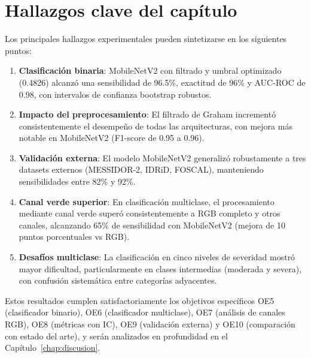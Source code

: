 \section*{Hallazgos clave del capítulo}

Los principales hallazgos experimentales pueden sintetizarse en los siguientes puntos:

\begin{enumerate}
    \item \textbf{Clasificación binaria}: MobileNetV2 con filtrado y umbral optimizado 
(0.4826) alcanzó una sensibilidad de 96.5\%, exactitud de 96\% y AUC-ROC de 0.98, con 
intervalos de confianza bootstrap robustos.

    \item \textbf{Impacto del preprocesamiento}: El filtrado de Graham incrementó 
consistentemente el desempeño de todas las arquitecturas, con mejora más notable en 
MobileNetV2 (F1-score de 0.95 a 0.96).

    \item \textbf{Validación externa}: El modelo MobileNetV2 generalizó robustamente a 
tres datasets externos (MESSIDOR-2, IDRiD, FOSCAL), manteniendo sensibilidades entre 82\% 
y 92\%.

    \item \textbf{Canal verde superior}: En clasificación multiclase, el procesamiento 
mediante canal verde superó consistentemente a RGB completo y otros canales, alcanzando 
65\% de sensibilidad con MobileNetV2 (mejora de 10 puntos porcentuales vs RGB).

    \item \textbf{Desafíos multiclase}: La clasificación en cinco niveles de severidad 
mostró mayor dificultad, particularmente en clases intermedias (moderada y severa), con 
confusión sistemática entre categorías adyacentes.
\end{enumerate}

Estos resultados cumplen satisfactoriamente los objetivos específicos OE5 (clasificador 
binario), OE6 (clasificador multiclase), OE7 (análisis de canales RGB), OE8 (métricas con 
IC), OE9 (validación externa) y OE10 (comparación con estado del arte), y serán 
analizados en profundidad en el Capítulo~\ref{chap:discusion}.
